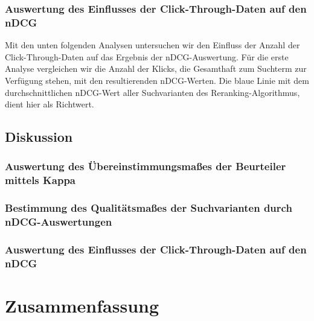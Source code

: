 

\subsubsection{Auswertung des Einflusses der Click-Through-Daten auf den nDCG}
\label{sec:Evaluation:Auswertung:QuantitativeAuswertung:EinflussNDCG}

Mit den unten folgenden Analysen untersuchen wir den Einfluss der Anzahl der Click-Through-Daten auf das Ergebnis der nDCG-Auswertung. Für die erste Analyse vergleichen wir die Anzahl der Klicks, die Gesamthaft zum Suchterm zur Verfügung stehen, mit den resultierenden nDCG-Werten. Die blaue Linie mit dem durchschnittlichen nDCG-Wert aller Suchvarianten des Reranking-Algorithmus, dient hier als Richtwert.



\subsection{Diskussion}
\label{sec:Evaluation:Auswertung:Diskussion}

\subsubsection{Auswertung des Übereinstimmungsmaßes der Beurteiler mittels Kappa}
\label{sec:Evaluation:Auswertung:Diskussion:Kappa}

\subsubsection{Bestimmung des Qualitätsmaßes der Suchvarianten durch nDCG-Auswertungen}
\label{sec:Evaluation:Auswertung:Diskussion:nDCG}


\subsubsection{Auswertung des Einflusses der Click-Through-Daten auf den nDCG}
\label{sec:Evaluation:Auswertung:Diskussion:EinflussNDCG}

\section{Zusammenfassung}
\label{sec:Evaluation:Zusammenfassung}


